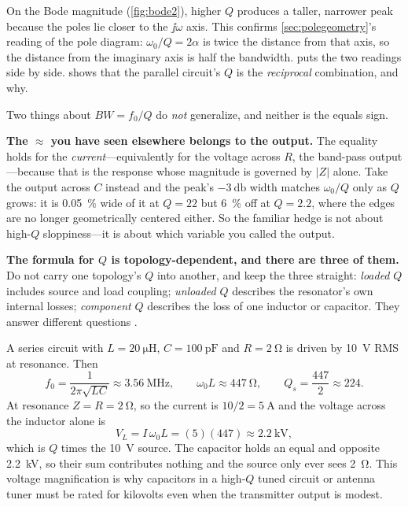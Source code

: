 On the Bode magnitude (\cref{fig:bode2}), higher \(Q\) produces a taller, narrower
peak because the poles lie closer to the \(\jj\omega\) axis. This confirms
\cref{sec:polegeometry}'s reading of the pole diagram: \(\omega_0/Q=2\alpha\) is
twice the distance from that axis, so the distance from the imaginary axis is half
the bandwidth.  puts the two readings side by side.
 shows that the parallel circuit's \(Q\)
is the \emph{reciprocal} combination, and why.

\begin{mistakebox}
Two things about \(BW=f_0/Q\) do \emph{not} generalize, and neither is the equals
sign.

\textbf{The \(\approx\) you have seen elsewhere belongs to the output.} The equality
holds for the \emph{current}---equivalently for the voltage across \(R\), the band-pass
output---because that is the response whose magnitude is governed by \(|Z|\) alone.
Take the output across \(C\) instead and the peak's \(-\SI{3}{\decibel}\) width
matches \(\omega_0/Q\) only as \(Q\) grows: it is \SI{0.05}{\percent} wide of it at
\(Q=22\) but \SI{6}{\percent} off at \(Q=2.2\), where the edges are no longer
geometrically centered either. So the familiar hedge is not about high-\(Q\)
sloppiness---it is about which variable you called the output.

\textbf{The formula for \(Q\) is topology-dependent, and there are three of them.}
Do not carry one topology's \(Q\) into another, and keep the three straight:
\emph{loaded} \(Q\) includes source and load coupling; \emph{unloaded} \(Q\)
describes the resonator's own internal losses; \emph{component} \(Q\) describes the
loss of one inductor or capacitor. They answer different questions
\cite[pp.~27--30]{bowick2008rfcircuit}.
\end{mistakebox}

\begin{workedbox}
A series circuit with \(L=\SI{20}{\micro\henry}\), \(C=\SI{100}{\pico\farad}\) and
\(R=\SI{2}{\ohm}\) is driven by \SI{10}{\volt} RMS at resonance. Then
\[
f_0=\frac{1}{2\pi\sqrt{LC}}\approx\SI{3.56}{\mega\hertz},
\qquad
\omega_0L\approx\SI{447}{\ohm},
\qquad
Q_s=\frac{447}{2}\approx224 .
\]
At resonance \(Z=R=\SI{2}{\ohm}\), so the current is \(10/2=\SI{5}{\ampere}\) and
the voltage across the inductor alone is
\[
V_L=I\,\omega_0L=(5)(447)\approx\SI{2.2}{\kilo\volt},
\]
which is \(Q\) times the \SI{10}{\volt} source. The capacitor holds an equal and
opposite \SI{2.2}{\kilo\volt}, so their sum contributes nothing and the source only
ever sees \SI{2}{\ohm}. This voltage magnification is why capacitors in a high-\(Q\)
tuned circuit or antenna tuner must be rated for kilovolts even when the transmitter
output is modest.
\end{workedbox}

